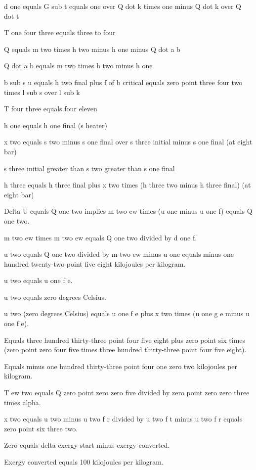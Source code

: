 d one equals G sub t equals one over Q dot k times one minus Q dot k over Q dot t

T one four three equals three to four

Q equals m two times h two minus h one minus Q dot a b

Q dot a b equals m two times h two minus h one

b sub s u equals h two final plus f of b critical equals zero point three four two times l sub s over l sub k

T four three equals four eleven

h one equals h one final (s heater)

x two equals s two minus s one final over s three initial minus s one final (at eight bar)

s three initial greater than s two greater than s one final

h three equals h three final plus x two times (h three two minus h three final) (at eight bar)

Delta U equals Q one two implies m two ew times (u one minus u one f) equals Q one two.

m two ew times m two ew equals Q one two divided by d one f.

u two equals Q one two divided by m two ew minus u one equals minus one hundred twenty-two point five eight kilojoules per kilogram.

u two equals u one f e.

u two equals zero degrees Celsius.

u two (zero degrees Celsius) equals u one f e plus x two times (u one g e minus u one f e).

Equals three hundred thirty-three point four five eight plus zero point six times (zero point zero four five times three hundred thirty-three point four five eight).

Equals minus one hundred thirty-three point four one zero two kilojoules per kilogram.

T ew two equals Q zero point zero zero five divided by zero point zero zero three times alpha.

x two equals u two minus u two f r divided by u two f t minus u two f r equals zero point six three two.

Zero equals delta exergy start minus exergy converted.

Exergy converted equals 100 kilojoules per kilogram.